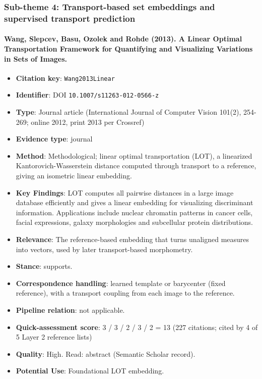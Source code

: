 \documentclass[journal,onecolumn]{IEEEtran}
\begin{document}
\subsubsection{Sub-theme 4: Transport-based set embeddings and supervised transport prediction}

\paragraph{Wang, Slepcev, Basu, Ozolek and Rohde (2013). A Linear Optimal Transportation Framework for Quantifying and Visualizing Variations in Sets of Images.~\cite{Wang2013Linear}}\mbox{}

\begin{itemize}

\item{} \textbf{Citation key}: \texttt{Wang2013Linear}

\item{} \textbf{Identifier}: DOI \nolinkurl{10.1007/s11263-012-0566-z}

\item{} \textbf{Type}: Journal article (International Journal of Computer Vision 101(2), 254-269; online 2012, print 2013 per Crossref)

\item{} \textbf{Evidence type}: journal

\item{} \textbf{Method}: Methodological; linear optimal transportation (LOT), a linearized Kantorovich-Wasserstein distance computed through transport to a reference, giving an isometric linear embedding.

\item{} \textbf{Key Findings}: LOT computes all pairwise distances in a large image database efficiently and gives a linear embedding for visualizing discriminant information. Applications include nuclear chromatin patterns in cancer cells, facial expressions, galaxy morphologies and subcellular protein distributions.

\item{} \textbf{Relevance}: The reference-based embedding that turns unaligned measures into vectors, used by later transport-based morphometry.

\item{} \textbf{Stance}: supports.

\item{} \textbf{Correspondence handling}: learned template or barycenter (fixed reference), with a transport coupling from each image to the reference.

\item{} \textbf{Pipeline relation}: not applicable.

\item{} \textbf{Quick-assessment score}: 3 / 3 / 2 / 3 / 2 = 13 (227 citations; cited by 4 of 5 Layer 2 reference lists)

\item{} \textbf{Quality}: High. Read: abstract (Semantic Scholar record).

\item{} \textbf{Potential Use}: Foundational LOT embedding.

\end{itemize}
\end{document}
